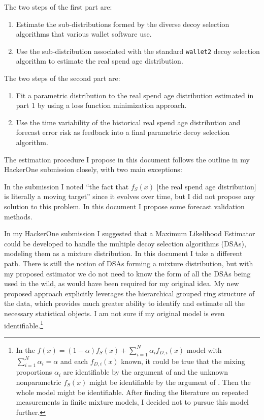 \documentclass[english]{article}
\begin{document}
The two steps of the first part are:
\begin{enumerate}
\item Estimate the sub-distributions formed by the diverse decoy selection
algorithms that various wallet software use.
\item Use the sub-distribution associated with the standard \texttt{wallet2}
decoy selection algorithm to estimate the real spend age distribution.
\end{enumerate}
The two steps of the second part are:
\begin{enumerate}
\item Fit a parametric distribution to the real spend age distribution estimated
in part 1 by using a loss function minimization approach.
\item Use the time variability of the historical real spend age distribution
and forecast error risk as feedback into a final parametric decoy
selection algorithm.
\end{enumerate}
The estimation procedure I propose in this document follows the outline
in my HackerOne submission closely, with two main exceptions:

In the submission I noted ``the fact that $f_{S}(x)$ {[}the real
spend age distribution{]} is literally a moving target'' since it
evolves over time, but I did not propose any solution to this problem.
In this document I propose some forecast validation methods.

In my HackerOne submission I suggested that a Maximum Likelihood Estimator
could be developed to handle the multiple decoy selection algorithms
(DSAs), modeling them as a mixture distribution. In this document
I take a different path. There is still the notion of DSAs forming
a mixture distribution, but with my proposed estimator we do not need
to know the form of all the DSAs being used in the wild, as would
have been required for my original idea. My new proposed approach
explicitly leverages the hierarchical grouped ring structure of the
data, which provides much greater ability to identify and estimate
all the necessary statistical objects. I am not sure if my original
model is even identifiable.\footnote{In the $f(x)=(1-\alpha)f_{S}(x)+\sum_{i=1}^{N}\alpha_{i}f_{D,i}(x)$
model with $\sum_{i=1}^{N}\alpha_{i}=\alpha$ and each $f_{D,i}(x)$
known, it could be true that the mixing proportions $\alpha_{i}$
are identifiable by the argument of \cite{Hall1981} and the unknown
nonparametric $f_{S}(x)$ might be identifiable by the argument of
\cite{Patra2016}. Then the whole model might be identifiable. After
finding the literature on repeated measurements in finite mixture
models, I decided not to pursue this model further.}
\end{document}

